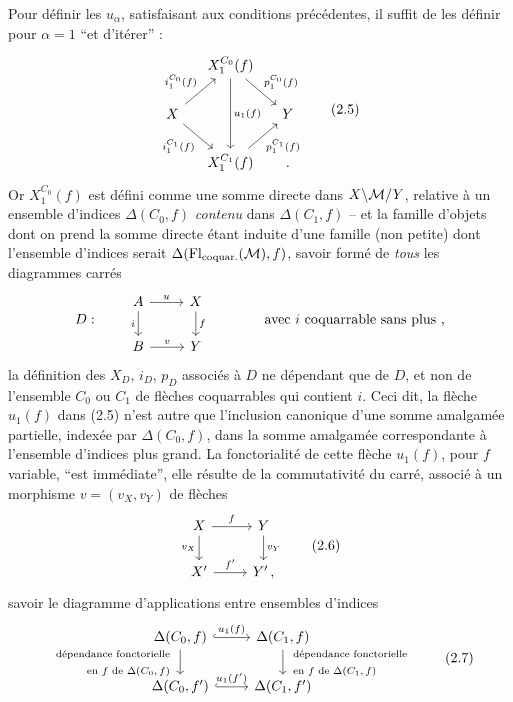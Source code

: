 Pour définir les $u_\alpha$, satisfaisant aux conditions précédentes, il suffit de les définir pour $\alpha=1$ ``et d'itérer'' :
\[
\begin{tikzcd}[column sep=small]
& X_1^{C_0}(f) \arrow[dd, "u_1(f)"] \arrow[dr, "p_1^{C_0}(f)"] & \\
X \arrow[ur, "i_1^{C_0}(f)"] \arrow[dr, "i_1^{C_1}(f)"'] & & Y \\
& X_1^{C_1}(f) \arrow[ur, "p_1^{C_1}(f)"'] & {}.
\end{tikzcd}
\tag*{(2.5)}
\]
Or $X_1^{C_0}(f)$ est défini comme une somme directe dans $X\backslash\mathcal{M}/Y$, relative à un ensemble d'indices $\Delta(C_0,f)$ \textit{contenu} dans $\Delta(C_1,f)$ -- et la famille d'objets dont on prend la somme directe étant induite d'une famille (non petite) dont l'ensemble d'indices serait $\Delta(\mathrm{Fl}_{\text{coquar.}}(\mathcal{M}),f)$, savoir formé de \textit{tous} les diagrammes carrés
\[
D : \qquad
\begin{tikzcd}
A \arrow[r, "u"] \arrow[d, "i"'] & X \arrow[d, "f"] \\
B \arrow[r, "v"] & Y
\end{tikzcd}
\qquad\qquad \text{avec $i$ coquarrable sans plus ,}
\]
la définition des $X_D$, $i_D$, $p_D$ associés à $D$ ne dépendant que de $D$, et non de l'ensemble $C_0$ ou $C_1$ de flèches coquarrables qui contient $i$. Ceci dit, la flèche $u_1(f)$
dans (2.5) n'est autre que l'inclusion canonique d'une somme amalgamée partielle, indexée par $\Delta(C_0,f)$, dans la somme amalgamée correspondante à l'ensemble d'indices plus grand. La fonctorialité de cette flèche $u_1(f)$, pour $f$ variable, ``est immédiate'', elle résulte de la commutativité du carré, associé à un morphisme $v=(v_X,v_Y)$ de flèches
\[
\begin{tikzcd}
X \arrow[r, "f"] \arrow[d, "v_X"'] & Y \arrow[d, "v_Y"] \\
X' \arrow[r, "f'"] & Y'\,,
\end{tikzcd}
\tag*{(2.6)}
\]
savoir le diagramme d'applications entre ensembles d'indices
\[
\begin{tikzcd}
\Delta(C_0,f) \arrow[r, hook, "u_1(f)"] \arrow[d, "{\begin{array}{r}\text{dépendance fonctorielle}\\ \text{en $f$ de $\Delta(C_0,f)$}\end{array}}"'] & \Delta(C_1,f) \arrow[d, "{\begin{array}{l}\text{dépendance fonctorielle}\\ \text{en $f$ de $\Delta(C_1,f)$}\end{array}}"] \\
\Delta(C_0,f') \arrow[r, hook, "u_1(f')"] & \Delta(C_1,f')
\end{tikzcd}
\tag*{(2.7)}
\]
